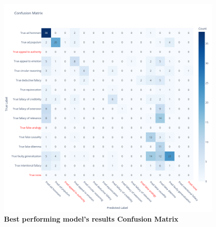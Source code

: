 \begin{figure}[H]
\centering
\includegraphics[width=\textwidth]{graphics/conf_matrix_meta-llama-Meta-Llama-3.1-8B-Instruct_prompt2_no_cot_FINE_GRAINED_results_with_definitions_42_no_sampling.png}
\caption{\textbf{Best performing model's results Confusion Matrix}}
\end{figure}


